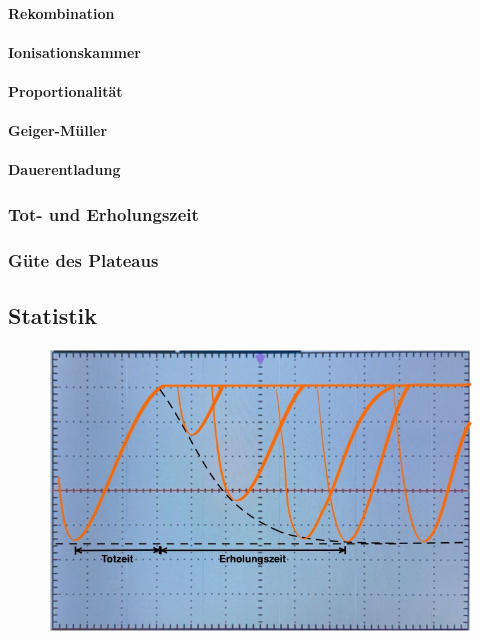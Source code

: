 \paragraph{Rekombination}

\paragraph{Ionisationskammer}

\paragraph{Proportionalität}

\paragraph{Geiger-Müller}

\paragraph{Dauerentladung}

\subsubsection{Tot- und Erholungszeit}

\subsubsection{Güte des Plateaus}

\subsection{Statistik}

\begin{figure}[H]
	\centering
	\includegraphics[width=0.5\linewidth]{content/grafik/zeit.jpg}
	\caption{}
	\label{fig:zeit}
\end{figure}

